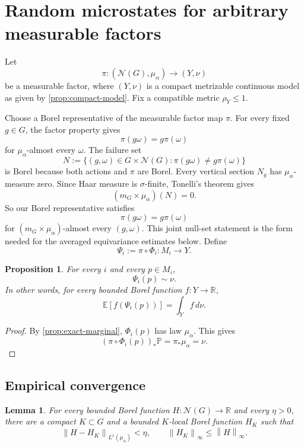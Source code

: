 \documentclass[12pt]{amsart}
\newtheorem{proposition}[proposition]{Proposition}
\newtheorem{lemma}[lemma]{Lemma}
\theoremstyle{definition}
\newcommand{\Haar}{m_G}
\newcommand{\cN}{\mathcal N}
\newcommand{\1}{\mathbf 1}
\newcommand{\norm}[1]{\left\lVert#1\right\rVert}
\begin{document}
\section{Random microstates for arbitrary measurable factors}

Let
\[
 \pi:(\cN(G),\mu_\alpha)\longrightarrow(Y,\nu)
\]
be a measurable factor, where $(Y,\nu)$ is a compact metrizable continuous model as given by \cref{prop:compact-model}. Fix a compatible metric $\rho_Y\leq1$.

Choose a Borel representative of the measurable factor map $\pi$. For every fixed $g\in G$, the factor property gives
\[
 \pi(g\omega)=g\pi(\omega)
\]
for $\mu_\alpha$-almost every $\omega$. The failure set
\[
 N:=\{(g,\omega)\in G\times\cN(G):
 \pi(g\omega)\neq g\pi(\omega)\}
\]
is Borel because both actions and $\pi$ are Borel. Every vertical section $N_g$ has $\mu_\alpha$-measure zero. Since Haar measure is $\sigma$-finite, Tonelli's theorem gives
\[
 (\Haar\times\mu_\alpha)(N)=0.
\]
So our Borel representative satisfies
\begin{equation}\label{eq:factor-ae}
 \pi(g\omega)=g\pi(\omega)
\end{equation}
for $(\Haar\times\mu_\alpha)$-almost every $(g,\omega)$. This joint null-set statement is the form needed for the averaged equivariance estimates below. Define
\[
 \Psi_i:=\pi\circ\Phi_i:M_i\longrightarrow Y.
\]
\begin{proposition}
\label{prop:factor-marginal}
For every $i$ and every $p\in M_i$,
\[
 \Psi_i(p)\sim\nu.
\]
In other words, for every bounded Borel function $f:Y\to\mathbb R$,
\[
 \mathbb E[f(\Psi_i(p))]=\int_Y f\,d\nu.
\]
\end{proposition}

\begin{proof}
By \cref{prop:exact-marginal}, $\Phi_i(p)$ has law $\mu_\alpha$. This gives
\[
 (\pi\circ\Phi_i(p))_*\mathbb P=\pi_*\mu_\alpha=\nu.
\]
\end{proof}

\subsection{Empirical convergence}


\begin{lemma}\label{lem:local-L1}
For every bounded Borel function $H:\cN(G)\to\mathbb R$ and every $\eta>0$, there are a compact $K\subset G$ and a bounded $K$-local Borel function $H_K$ such that
\[
 \norm{H-H_K}_{L^1(\mu_\alpha)}<\eta,
 \qquad \norm{H_K}_\infty\leq\norm{H}_\infty.
\]
\end{lemma}
\end{document}
